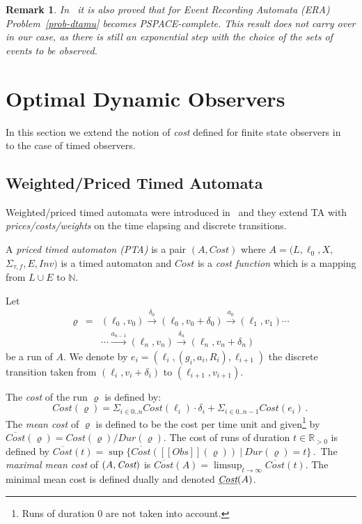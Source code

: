 \documentclass[letterpaper,10pt,conference]{ieeeconf}  \IEEEoverridecommandlockouts                              \overrideIEEEmargins
\newtheorem{remark}{Remark}
\newcommand{\sem}[1]{[\![#1]\!]}
\newcommand{\setN}{\mathbb N}
\newcommand{\setR}{\mathbb R}
\def\Cost{\textit{Cost}}
\def\MeanCost{\textit{$\overline{\Cost}$}}
\def\endef{\ifmmode\squareforged\else{\unskip\nobreak\hfil
\penalty50\hskip1em\null\nobreak\hfil$\blacksquare$
\parfillskip=0pt\finalhyphendemerits=0\endgraf}\fi}
\def\tauac{\tau}
\newcommand{\dur}{{\textit{Dur}}} \def\inv{\textit{Inv}}
\def\obs{\textit{Obs}\xspace}
\begin{document}
\begin{remark}
  In~\cite{Bouyerfossacs05} it is also proved that for Event Recording
  Automata (ERA)~\cite{AFH94} Problem~\ref{prob-dtamu} becomes
  PSPACE-complete.  This result does not carry over in our case, as
  there is still an exponential step with the choice of the sets of
  events to be observed.
\end{remark}

\section{Optimal Dynamic Observers}\label{sec-cost}
In this section we extend the notion of \emph{cost} defined for finite
state observers in~\cite{cassez-fi-08} to the case of timed observers.

\subsection{Weighted/Priced Timed Automata}
Weighted/priced timed automata were introduced in~\cite{BFH+01,ATP01}
and they extend TA with \emph{prices/costs/weights} on the time
elapsing and discrete transitions.

\begin{definition}
  A \emph{priced timed auto\-ma\-ton (PTA)} is a pair $(A,\Cost)$
  where $A=(L,\ell_0,X,$ $\Sigma_{\tauac,f},E,\inv)$ is a timed automaton
  and $\Cost$ is a \emph{cost function} which is a mapping from $L
  \cup E$ to $\setN$. \endef
\end{definition}
Let 
\begin{eqnarray*}
  \varrho & = & (\ell_0,v_0) \xrightarrow{\delta_0} (\ell_0,v_0 + \delta_0)
  \xrightarrow{a_0} (\ell_1,v_1) \cdots  \\ & & \cdots \xrightarrow{a_{n-1}} (\ell_n,v_n)
  \xrightarrow{\delta_n} (\ell_n,v_n+ \delta_n) 
\end{eqnarray*}
be a run of $A$. We denote by $e_i=(\ell_i,(g_i,a_i,R_i),\ell_{i+1})$
the discrete transition taken from $(\ell_i,v_i+\delta_i)$ to
$(\ell_{i+1},v_{i+1})$.

The \emph{cost} of the run $\varrho$ is defined by:
\[
\Cost(\varrho) = \Sigma_{i \in 0..n} \Cost(\ell_i) \cdot \delta_i + 
\Sigma_{i \in 0..n-1} \Cost(e_i)\mathpunct.
\]
The \emph{mean cost} of $\varrho$ is defined to be the cost per time
unit and given\footnote{Runs of duration $0$ are not taken into
  account.} by $\MeanCost(\varrho)=\Cost(\varrho)/\dur(\varrho)$.  The
cost of runs of duration $t \in \setR_{>0}$ is defined by
$\MeanCost(t)=\sup \{ \MeanCost(\sem{\obs}(\varrho)) \ | \
\dur(\varrho)=t \}\mathpunct.$ The \emph{maximal mean cost} of
$(A,\textit{Cost})$ is $\MeanCost(A)=\limsup_{t\rightarrow \infty}
\MeanCost(t)$.  The minimal mean cost is defined dually and denoted
$\underline{\textit{Cost}}(A)$.
\end{document}
